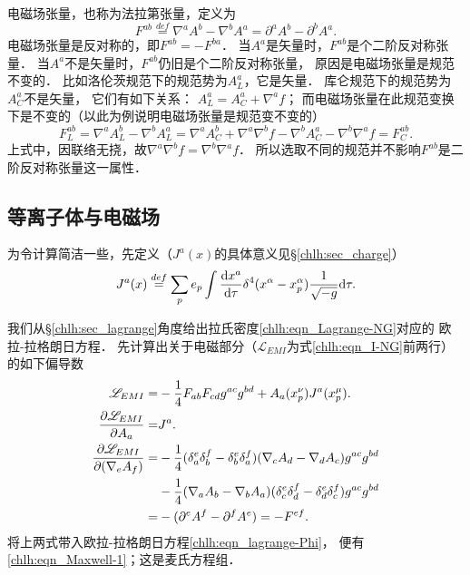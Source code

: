 {\heiti 电磁场张量}，也称为法拉第张量，定义为
\begin{equation}\label{chlh:eqn_Fab}
    F^{ab} \overset{def}{=} \nabla^a A^b - \nabla^b A^a =\partial^a A^b - \partial^b A^a .
\end{equation}
电磁场张量是反对称的，即$F^{ab}=-F^{ba}$．
当$A^a$是矢量时，$F^{ab}$是个二阶反对称张量．
当$A^a${\kaishu 不}是矢量时，$F^{ab}$仍旧是个二阶反对称张量，
原因是电磁场张量是规范不变的．
比如洛伦茨规范下的规范势为$A^a_L$，它是矢量．
库仑规范下的规范势为$A^a_C$不是矢量，
它们有如下关系： $ A^a_L = A^a_C + \nabla ^a f $；
而电磁场张量在此规范变换下是不变的（以此为例说明电磁场张量是规范变不变的）
\begin{equation}\label{chsr:eqn_F-gauge-inv}
    F^{ab}_{L} = \nabla^a A^b_L - \nabla^b A^a_L
    = \nabla^a A^b_C + {\nabla^a \nabla^b f}
     -\nabla^b A^a_C - {\nabla^b \nabla^a f}
    =F^{ab}_{C}.
\end{equation}
上式中，因联络无挠，故$\nabla^a \nabla^b f =\nabla^b \nabla^a f $．
所以选取不同的规范并不影响$F^{ab}$是二阶反对称张量这一属性．







\subsection{等离子体与电磁场}\label{chlh:sec_plasma}
为令计算简洁一些，先定义（$J^a(x)$的具体意义见\S\ref{chlh:sec_charge}）
\begin{equation}\label{chlh:eqn_eCurrent}
    J^a(x) \overset{def}{=} \sum_{p} e_{p} \int  \frac{{\rm d} x^a}{{\rm d} \tau}
    \delta^4(x^\alpha-x^\alpha_p)\frac{1}{\sqrt{-g}} {\rm d} \tau .
\end{equation}


我们从\S\ref{chlh:sec_lagrange}角度给出拉氏密度\eqref{chlh:eqn_Lagrange-NG}对应的
欧拉-拉格朗日方程．
先计算出关于电磁部分（$\mathscr{L}_{EMI}$为式\eqref{chlh:eqn_I-NG}前两行）的如下偏导数
\begin{align}
    \mathscr{L}_{EMI} =& -\frac{1}{4} F_{ab} F_{cd} g^{ac}g^{bd}
    +  A_{a}(x^\nu_p) J^a(x^\mu_p) .    \label{chlh:eqn_L-EMI}  \\
    \frac{\partial \mathscr{L}_{EMI}} {\partial  A_a } = &
    J^a . \label{chlh:eqn_DLEMDA=J} \\
    \frac{\partial \mathscr{L}_{EMI}} {\partial (\nabla_e A_f )}
    =& -\frac{1}{4}(\delta^e_a \delta^f_b - \delta^e_b \delta^f_a )
    (\nabla_c A_d - \nabla_d A_c) g^{a c} g^{b d} \notag \\
    &-\frac{1}{4}(\nabla_a A_b - \nabla_b A_a)
    (\delta^e_c \delta^f_d - \delta^e_d \delta^f_c) 
    g^{a c}g^{b d}   \notag  \\
    =& -( \partial^e A^f - \partial^f A^e)
    = - F^{ef}. \label{chlh:eqn_DLEMDA}     
\end{align}
将上两式带入欧拉-拉格朗日方程\eqref{chlh:eqn_lagrange-Phi}，
便有\eqref{chlh:eqn_Maxwell-1}；这是麦氏方程组．

